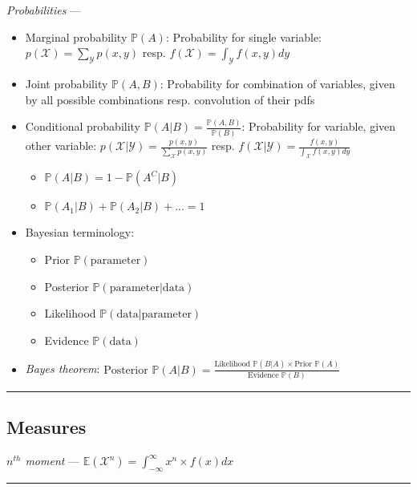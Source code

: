 \emph{Probabilities} --- 
\begin{itemize}
    \item Marginal probability $\mathbb{P}(A)$: Probability for single variable: $p(\mathcal{X}) = \sum_{\mathcal{Y}}p(x,y)$ resp. $f(\mathcal{X}) = \int_{\mathcal{Y}}f(x,y)dy$
    \item Joint probability $\mathbb{P}(A, B)$: Probability for combination of variables, given by all possible combinations resp. convolution of their pdfs 
    \item Conditional probability $\mathbb{P}(A|B) = \frac{\mathbb{P}(A, B)}{\mathbb{P}(B)}$: Probability for variable, given other variable: $p(\mathcal{X}|\mathcal{Y}) = \frac{p(x,y)}{\sum_{\mathcal{X}}p(x,y)}$ resp. $f(\mathcal{X}|\mathcal{Y}) = \frac{f(x,y)}{\int_{\mathcal{X}}f(x,y)dy}$
    \begin{itemize}
        \item $\mathbb{P}(A|B) = 1 - \mathbb{P}(A^C|B)$
        \item $\mathbb{P}(A_1|B) + \mathbb{P}(A_2|B) + ... = 1$
    \end{itemize}
    \item Bayesian terminology: 
    \begin{itemize}
        \item Prior $\mathbb{P}(\textrm{parameter})$
        \item Posterior $\mathbb{P}(\textrm{parameter} | \textrm{data})$
        \item Likelihood $\mathbb{P}(\textrm{data} | \textrm{parameter})$
        \item Evidence $\mathbb{P}(\textrm{data})$
    \end{itemize}
    \item \emph{Bayes theorem}: $\textrm{Posterior } \mathbb{P}(A|B) = \frac{\textrm{Likelihood }\mathbb{P}(B|A) \times  \textrm{Prior }\mathbb{P}(A)}{\textrm{Evidence }\mathbb{P}(B)}$
\end{itemize}

{\color{black}\hrule height 0.001mm}

\subsection*{Measures}
\emph{$n^{th}$ moment} --- 
$\mathbb{E}(\mathcal{X}^n) = \int_{-\infty}^{\infty}x^n \times f(x)dx$

{\color{lightgray}\hrule height 0.001mm}

